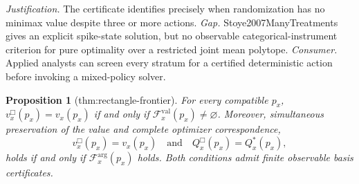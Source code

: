 \documentclass{article}
\newtheorem{proposition}{Proposition}
\begin{document}
\par\smallskip\noindent \textit{Justification.} The certificate identifies precisely when randomization has no minimax value despite three or more actions. \textit{Gap.} Stoye2007ManyTreatments gives an explicit spike-state solution, but no observable categorical-instrument criterion for pure optimality over a restricted joint mean polytope. \textit{Consumer.} Applied analysts can screen every stratum for a certified deterministic action before invoking a mixed-policy solver.

\begin{proposition}[thm:rectangle-frontier]\label{thm:rectangle-frontier}
For every compatible \(p_x\), \(v_x^{\Box}(p_x)=v_x(p_x)\) if and only if \(\mathcal F_x^{\mathrm{val}}(p_x)\neq\varnothing\).  Moreover, simultaneous preservation of the value and complete optimizer correspondence,
\[
 v_x^{\Box}(p_x)=v_x(p_x)\quad\text{and}\quad Q_x^{\Box}(p_x)=Q_x^*(p_x),
\]
holds if and only if \(\mathcal F_x^{\mathrm{arg}}(p_x)\) holds.  Both conditions admit finite observable basis certificates.
\end{proposition}
\end{document}
